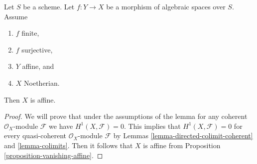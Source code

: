 \begin{lemma}
\label{lemma-image-affine-finite-morphism-affine-Noetherian}
Let $S$ be a scheme. Let $f : Y \to X$ be a morphism of algebraic
spaces over $S$. Assume
\begin{enumerate}
\item $f$ finite,
\item $f$ surjective,
\item $Y$ affine, and
\item $X$ Noetherian.
\end{enumerate}
Then $X$ is affine.
\end{lemma}

\begin{proof}
We will prove that under the assumptions of the lemma for any coherent
$\mathcal{O}_X$-module $\mathcal{F}$ we have $H^1(X, \mathcal{F}) = 0$.
This implies that $H^1(X, \mathcal{F}) = 0$ for every quasi-coherent
$\mathcal{O}_X$-module $\mathcal{F}$ by
Lemmas \ref{lemma-directed-colimit-coherent} and \ref{lemma-colimits}.
Then it follows that $X$ is affine from
Proposition \ref{proposition-vanishing-affine}.


\end{proof}
